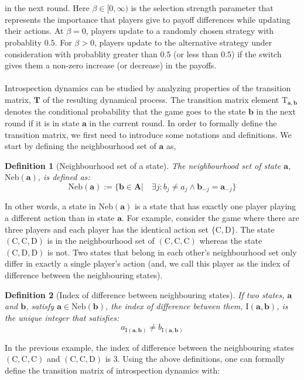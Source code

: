 \documentclass[11pt]{article}
\theoremstyle{plainCl1}
\newtheorem{definition}{Definition}
\theoremstyle{plainCl2}
\newcommand{\A}{\mathbf{A}}
\newcommand{\abf}{\mathbf{a}}
\newcommand{\bbf}{\mathbf{b}}
\newcommand{\T}{\mathbf{T}}
\newcommand{\C}{\mathrm{C}}
\newcommand{\D}{\mathrm{D}}
\begin{document}
\\ \\ \noindent in the next round. Here $\beta \in [0,\infty)$ is the selection strength parameter that represents the importance that players give to payoff differences while updating their actions. At $\beta = 0$, players update to a randomly chosen strategy with probablity $0.5$. For $\beta > 0$, players update to the alternative strategy under consideration with probablity greater than $0.5$ (or less than $0.5$) if the switch gives them a non-zero increase (or decrease) in the payoffs. \\ \\ 
\noindent Introspection dynamics can be studied by analyzing properties of the transition matrix, $\T$ of the resulting dynamical process. The transition matrix element $\mathrm{T}_{\abf,\bbf}$ denotes the conditional probability that the game goes to the state $\bbf$ in the next round if it is in state $\abf$ in the current round. In order to formally define the transition matrix, we first need to introduce some notations and definitions. We start by defining the neighbourhood set of $\abf$ as,

\begin{definition}[Neighbourhood set of a state] The neighbourhood set of state $\abf$, $\mathrm{Neb}(\abf)$, is defined as:
\begin{equation}
\mathrm{Neb}(\abf) := \{\bbf \in \A  \big| \quad \exists j:  b_{j} \neq a_{j} \land \bbf_{-j} = \abf_{-j}  \}
\label{Eq:neighbourhood-states}
\end{equation} 
\label{Def:neighbourhood-states}
\end{definition} 
\noindent In other words, a state in $\mathrm{Neb}(\abf)$ is a state that has exactly one player playing a different action than in state $\abf$. For example, consider the game where there are  three players and each player has the identical action set $\{\C, \D \}$.  The state $(\C,\C,\D)$ is in the neighbourhood set of $(\C,\C,\C)$ whereas the state $(\C,\D,\D)$ is not. Two states that belong in each other's neighbourhood set only differ in exactly a single player's action (and, we call this player as the index of difference between the neighbouring states).

\begin{definition} [Index of difference between neighbouring states] If two states, $\abf$ and $\bbf$, satisfy $\abf \in \mathrm{Neb}(\bbf)$, the index of difference between them, $\mathrm{I}(\abf, \bbf)$, is the unique integer that satisfies:
\begin{equation}
a_{\mathrm{I}(\abf, \bbf)} \neq b_{\mathrm{I}(\abf, \bbf)}
\end{equation} 
\label{Def:index-of-difference}
\end{definition} 
\noindent In the previous example, the index of difference between the neighbouring states $(\C,\C,\C)$ and $(\C,\C,\D)$ is $3$. Using the above definitions, one can formally define the transition matrix of introspection dynamics with:
\end{document}
